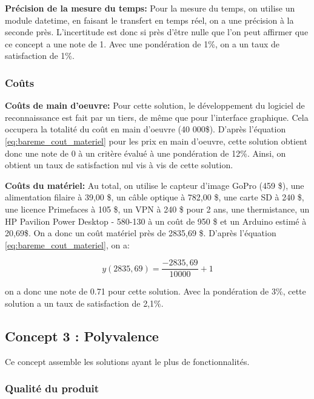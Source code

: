 \textbf{Précision de la mesure du temps:}
Pour la mesure du temps, on utilise un module datetime, en faisant le transfert en temps réel, on a une précision à la seconde près. L'incertitude est donc si près d'être nulle que l'on peut affirmer que ce concept a une note de 1. Avec une pondération de 1\%, on a un taux de satisfaction de 1\%. 
\vspace{5mm}



\subsubsection{Coûts}

\textbf{Coûts de main d'oeuvre:}
Pour cette solution, le développement du logiciel de reconnaissance est fait par un tiers, de même que pour l'interface graphique. Cela occupera la totalité du coût en main d'oeuvre (40 000\$). D'après l'équation \ref{eq:bareme_cout_materiel} pour les prix en main d'oeuvre, cette solution obtient donc une note de 0 à un critère évalué à une pondération de 12\%. Ainsi, on obtient un taux de satisfaction nul vis à vis de cette solution.
\vspace{5mm}

\textbf{Coûts du matériel:}
Au total, on utilise le capteur d'image GoPro (459 \$), une alimentation filaire à 39,00 \$, un câble optique à 782,00 \$, une carte SD à 240 \$, une licence Primefaces à 105 \$, un VPN à 240 \$ pour 2 ans, une thermistance, un HP Pavilion Power Desktop - 580-130 à un coût de 950 \$ et un Arduino estimé à 20,69\$. On a donc un coût matériel près de 2835,69 \$. D'après l'équation \ref{eq:bareme_cout_materiel}, on a:

\begin{equation}
y(2835,69) =  \frac{-2835,69}{10000} +1 \end{equation}

on a donc une note de 0.71 pour cette solution. Avec la pondération de 3\%, cette solution a un taux de satisfaction de 2,1\%.

\subsection{Concept 3 : Polyvalence}

Ce concept assemble les solutions ayant le plus de fonctionnalités.

\subsubsection{Qualité du produit}

